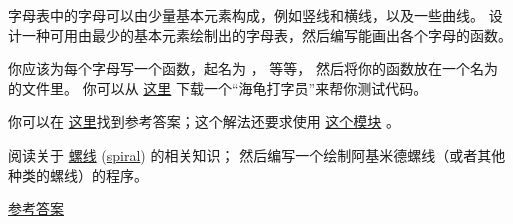 \begin{exercise}
    


字母表中的字母可以由少量基本元素构成，例如竖线和横线，以及一些曲线。
设计一种可用由最少的基本元素绘制出的字母表，然后编写能画出各个字母的函数。


你应该为每个字母写一个函数，起名为 ， 等等，
然后将你的函数放在一个名为  的文件里。
你可以从 \href{http://thinkpython2.com/code/typewriter.py}{这里}
下载一个``海龟打字员''来帮你测试代码。


你可以在 \href{http://thinkpython2.com/code/letters.py}{这里}找到参考答案；这个解法还要求使用 \href{http://thinkpython2.com/code/polygon.py}{这个模块} 。

\end{exercise}

\begin{exercise}


阅读关于 \href{https://zh.wikipedia.org/wiki/%E8%9E%BA%E7%BA%BF}{螺线} (\href{http://en.wikipedia.org/wiki/Spiral}{spiral}) 的相关知识；
然后编写一个绘制阿基米德螺线（或者其他种类的螺线）的程序。
  

\href{http://thinkpython2.com/code/spiral.py}{参考答案}

\end{exercise}

